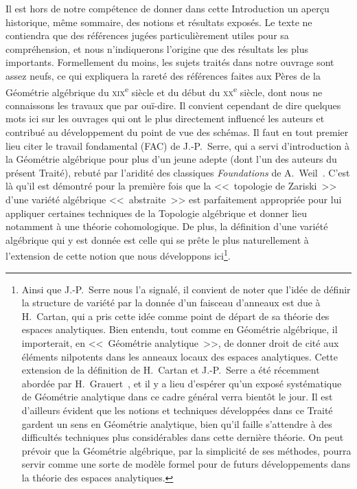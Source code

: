 Il est hors de notre compétence de donner dans cette Introduction un aperçu historique, même sommaire, des notions et résultats exposés.
Le texte ne contiendra que des références jugées particulièrement utiles pour sa compréhension, et nous n'indiquerons l'origine que des résultats les plus importants.
Formellement du moins, les sujets traités dans notre ouvrage sont assez neufs, ce qui expliquera la rareté des références faites aux Pères de la Géométrie algébrique du \textsc{xix}\textsuperscript{e} siècle et du début du \textsc{xx}\textsuperscript{e} siècle, dont nous ne connaissons les travaux que par ouï-dire.
Il convient cependant de dire quelques mots ici sur les ouvrages qui ont le plus directement influencé les auteurs et contribué au développement du point de vue des schémas.
Il faut en tout premier lieu citer le travail fondamental (FAC) de J.-P.~Serre, qui a servi d'introduction à la Géométrie algébrique pour plus d'un jeune adepte (dont l'un des auteurs du présent Traité), rebuté par l'aridité des classiques \emph{Foundations} de A.~Weil~\cite{I-18}.
C'est là qu'il est démontré pour la première fois que la <<~topologie de Zariski~>> d'une variété algébrique <<~abstraite~>> est parfaitement appropriée pour lui appliquer certaines techniques de la Topologie algébrique et donner lieu notamment à une théorie cohomologique.
De plus, la définition d'une variété algébrique qui y est donnée est celle qui se prête le plus naturellement à l'extension de cette notion que nous développons ici\footnote{Ainsi que J.-P.~Serre nous l'a signalé, il convient de noter que l'idée de définir la structure de variété par la donnée d'un faisceau d'anneaux est due à H.~Cartan, qui a pris cette idée comme point de départ de sa théorie des espaces analytiques.
Bien entendu, tout comme en Géométrie algébrique, il importerait, en <<~Géométrie analytique~>>, de donner droit de cité aux éléments nilpotents dans les anneaux locaux des espaces analytiques.
Cette extension de la définition de H.~Cartan et J.-P.~Serre a été récemment abordée par H.~Grauert~\cite{I-5}, et il y a lieu d'espérer qu'un exposé systématique de Géométrie analytique dans ce cadre général verra bientôt le jour.
Il est d'ailleurs évident que les notions et techniques développées dans ce Traité gardent un sens en Géométrie analytique, bien qu'il faille s'attendre à des difficultés techniques plus considérables dans cette dernière théorie.
On peut prévoir que la Géométrie algébrique, par la simplicité de ses méthodes, pourra servir comme une sorte de modèle formel pour de futurs développements dans la théorie des espaces analytiques.}.
